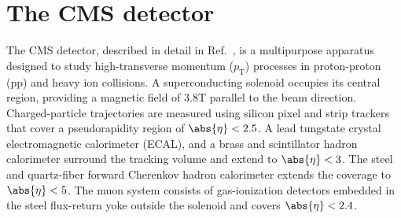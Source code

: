 %
%
%

\section{The CMS detector}

The CMS detector, described in detail in Ref.~\cite{CMSdetector}, is a multipurpose apparatus designed to study high-transverse momentum ($p_\mathrm{T}$) processes in proton-proton (pp) and heavy ion collisions.
%                                                                                                                                                                                                    
A superconducting solenoid occupies its central region, providing a magnetic field of 3.8\unit{T} parallel to the beam direction.
%                                                                                                                                                                                                    
Charged-particle trajectories are measured using silicon pixel and strip trackers that cover a pseudorapidity region of $\abs{\eta} < 2.5$.
%                                                                                                                                                                                                    
A lead tungstate crystal electromagnetic calorimeter (ECAL), and a brass and scintillator hadron calorimeter  surround the tracking volume and extend to $\abs{\eta} < 3$.
%                                                                                                                                                                                                    
The steel and quartz-fiber forward Cherenkov hadron calorimeter extends the coverage to $\abs{\eta} < 5$.
%                                                                                                                                                                                                    
The muon system consists of gas-ionization detectors embedded in the steel flux-return yoke outside the solenoid and covers $\abs{\eta} < 2.4$.
